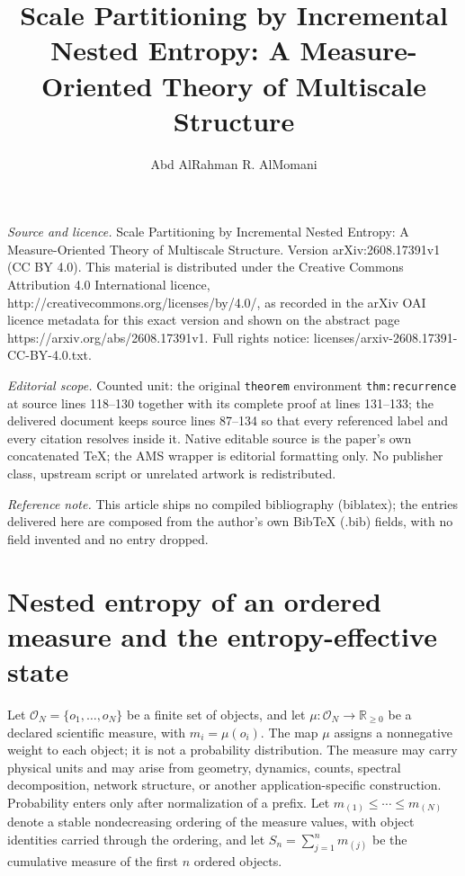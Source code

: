 \documentclass[10pt,a4paper]{amsart}
\newcommand{\cO}{\mathcal O}
\newcommand{\Rplus}{\mathbb R_{\ge 0}}
\begin{document}
\title[Scale Partitioning by Incremental Nested Entropy: A Measure-]{Scale Partitioning by Incremental Nested Entropy: A Measure-Oriented Theory of Multiscale Structure}
\author{Abd AlRahman R. AlMomani}
\date{}
\maketitle
\noindent\emph{Source and licence.} Scale Partitioning by Incremental Nested Entropy: A Measure-Oriented Theory of Multiscale Structure. Version arXiv:2608.17391v1 (CC BY 4.0). This material is distributed under the Creative Commons Attribution 4.0 International licence, http://creativecommons.org/licenses/by/4.0/, as recorded in the arXiv OAI licence metadata for this exact version and shown on the abstract page https://arxiv.org/abs/2608.17391v1. Full rights notice: licenses/arxiv-2608.17391-CC-BY-4.0.txt.\par\smallskip
\noindent\textit{Editorial scope.} Counted unit: the original \texttt{theorem} environment \texttt{thm:recurrence} at source lines 118--130 together with its complete proof at lines 131--133; the delivered document keeps source lines 87--134 so that every referenced label and every citation resolves inside it. Native editable source is the paper's own concatenated TeX; the AMS wrapper is editorial formatting only. No publisher class, upstream script or unrelated artwork is redistributed.
\par\smallskip\noindent\textit{Reference note.} This article ships no compiled bibliography (biblatex); the entries delivered here are composed from the author's own BibTeX (.bib) fields, with no field invented and no entry dropped.
\section{Nested entropy of an ordered measure and the entropy-effective state}
\label{sec:nested}

Let \(\cO_N=\{o_1,\ldots,o_N\}\) be a finite set of objects, and let \(\mu:\cO_N\to\Rplus\) be a declared scientific measure, with \(m_i=\mu(o_i)\). The map \(\mu\) assigns a nonnegative weight to each object; it is not a probability distribution. The measure may carry physical units and may arise from geometry, dynamics, counts, spectral decomposition, network structure, or another application-specific construction. Probability enters only after normalization of a prefix. Let \(m_{(1)}\le\cdots\le m_{(N)}\) denote a stable nondecreasing ordering of the measure values, with object identities carried through the ordering, and let \(S_n=\sum_{j=1}^n m_{(j)}\) be the cumulative measure of the first \(n\) ordered objects. %
\end{document}

